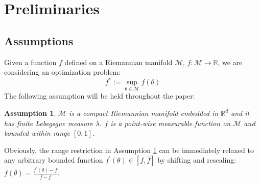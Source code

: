 \documentclass{article} %
\newtheorem{assumption}{Assumption}
\begin{document}
\section{Preliminaries}
\subsection{Assumptions}
Given a function $f$ defined on a Riemannian manifold $\mathcal{M}$, $f:\mathcal{M}\rightarrow \mathbb{R}$, we are considering an optimization problem:
\begin{equation}
	f^*:=\sup_{\theta\in \mathcal{M}} f(\theta)
\end{equation}
The following assumption will be held throughout the paper:  
\begin{assumption}
	\label{assumption:basics}
	$\mathcal{M}$ is a compact Riemannian manifold embedded in $\mathbb{R}^d$ and it has finite Lebegsgue measure $\lambda$. 
	$f$ is a point-wise measurable function on $\mathcal{M}$ and bounded within range $[0,1]$.  
\end{assumption}
Obviously, the range restriction in Assumption \ref{assumption:basics} can be immediately relaxed to any arbitrary bounded function $f^\prime(\theta) \in [\underline{f},\bar{f}]$ by shifting and rescaling: $f(\theta)=\frac{f^\prime(\theta)-\underline{f}}{\bar{f}-\underline{f}}$.  
\end{document}
